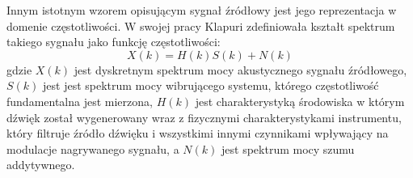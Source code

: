 \documentclass[12pt,a4paper,twoside]{mwart}
\begin{document}
Innym istotnym wzorem opisującym sygnał źródłowy jest jego reprezentacja w domenie częstotliwości. W swojej pracy Klapuri \cite[806]{Transcription:Klapuri:MultipleFundamentalFrequencyEstimation} zdefiniowała kształt spektrum takiego sygnału jako funkcję częstotliwości:
\begin{equation}\label{eq:Klapuri:spectrum}
X(k) = H(k)S(k) + N(k)
\end{equation}
gdzie $X(k)$ jest dyskretnym spektrum mocy akustycznego sygnału źródłowego, $S(k)$ jest jest spektrum mocy wibrującego systemu, którego częstotliwość fundamentalna jest mierzona, $H(k)$ jest charakterystyką środowiska w którym dźwięk został wygenerowany wraz z fizycznymi charakterystykami instrumentu, który filtruje źródło dźwięku i wszystkimi innymi czynnikami wpływający na modulacje nagrywanego sygnału, a $N(k)$ jest spektrum mocy szumu addytywnego. 
\end{document}

